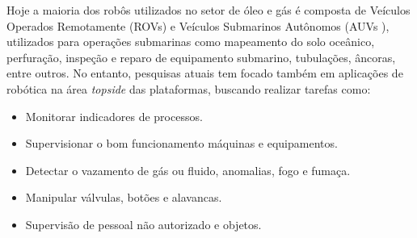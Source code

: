 Hoje a maioria dos robôs utilizados no setor de óleo e gás é composta de Veículos Operados Remotamente (ROVs\footnotemark[1]) e Veículos Submarinos Autônomos (AUVs \footnotemark[2]), utilizados para operações submarinas como mapeamento do solo oceânico, perfuração, inspeção e reparo de equipamento submarino, tubulações, âncoras, entre outros. No entanto, pesquisas atuais tem focado também em aplicações de robótica na área \textit{topside} das plataformas, buscando realizar tarefas como:
\begin{itemize}
\item Monitorar indicadores de processos.
\item Supervisionar o bom funcionamento máquinas e equipamentos.
\item Detectar o vazamento de gás ou fluido, anomalias, fogo e fumaça.
\item Manipular válvulas, botões e alavancas.
\item Supervisão de pessoal não autorizado e objetos.
\end{itemize} 



\newlength{\tsub}
\newsavebox{\tsubbox}

